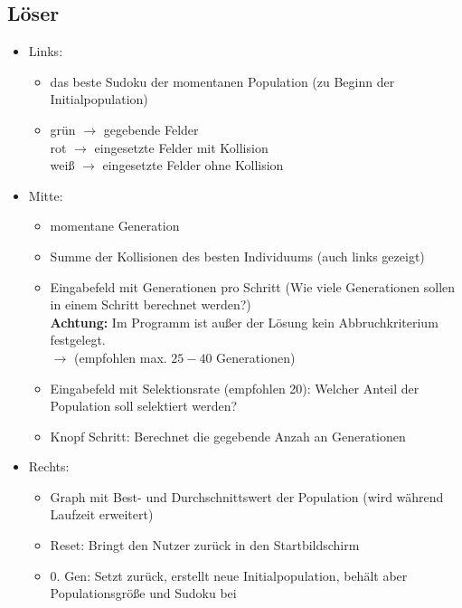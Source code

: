 \documentclass[fontsize=11pt, DIV=calc]{scrartcl} %
\begin{document}
    \subsection*{Löser}
    \begin{itemize}
        \item Links: 
        \begin{itemize}
            \item das beste Sudoku der momentanen Population (zu Beginn der Initialpopulation)
            \item grün \(\rightarrow\) gegebende Felder \\
            rot \(\rightarrow\) eingesetzte Felder mit Kollision \\
            weiß \(\rightarrow\) eingesetzte Felder ohne Kollision
        \end{itemize}
        \item Mitte:
        \begin{itemize}
            \item momentane Generation
            \item Summe der Kollisionen des besten Individuums (auch links gezeigt)
            \item Eingabefeld mit Generationen pro Schritt (Wie viele Generationen sollen in einem Schritt berechnet werden?)
            \\ \textbf{Achtung:} Im Programm ist außer der Lösung kein Abbruchkriterium festgelegt.\\ \(\rightarrow\) (empfohlen max. \(25-40\) Generationen)
            \item Eingabefeld mit Selektionsrate (empfohlen 20): Welcher Anteil der Population soll selektiert werden?
            \item Knopf Schritt: Berechnet die gegebende Anzah an Generationen
        \end{itemize}
        \item Rechts:
        \begin{itemize}
            \item Graph mit Best- und Durchschnittswert der Population (wird während Laufzeit erweitert)
            \item Reset: Bringt den Nutzer zurück in den Startbildschirm
            \item 0. Gen: Setzt zurück, erstellt neue Initialpopulation, behält aber Populationsgröße und Sudoku bei
        \end{itemize}
    \end{itemize}
\end{document}
